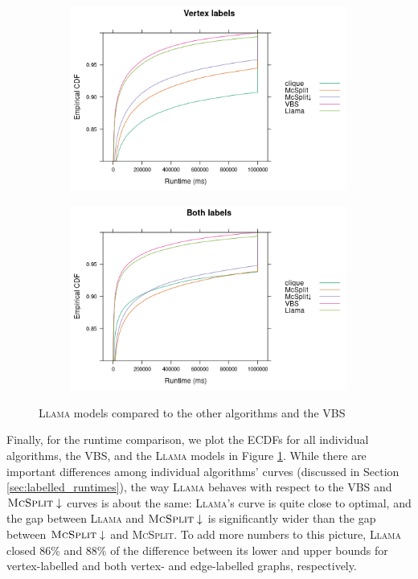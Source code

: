 \documentclass{l4proj}
\theoremstyle{definition}
\theoremstyle{remark}
\begin{document}
\begin{figure}
  \centering
  \begin{subfigure}[t]{0.49\textwidth}
    \centering
    \includegraphics[width=\textwidth]{images/ecdf_vertex_labels_llama.png}
  \end{subfigure}
  \begin{subfigure}[t]{0.49\textwidth}
    \centering
    \includegraphics[width=\textwidth]{images/ecdf_both_labels_llama.png}
  \end{subfigure}
  \caption{\textsc{Llama} models compared to the other algorithms and the VBS}
  \label{fig:ecdf_llama}
\end{figure}

Finally, for the runtime comparison, we plot the ECDFs for all individual
algorithms, the VBS, and the \textsc{Llama} models in Figure
\ref{fig:ecdf_llama}. While there are important differences among individual
algorithms' curves (discussed in Section \ref{sec:labelled_runtimes}), the way
\textsc{Llama} behaves with respect to the VBS and $\textsc{McSplit}\downarrow$
curves is about the same: \textsc{Llama}'s curve is quite close to optimal, and
the gap between \textsc{Llama} and $\textsc{McSplit}\downarrow$ is significantly
wider than the gap between $\textsc{McSplit}\downarrow$ and \textsc{McSplit}. To
add more numbers to this picture, \textsc{Llama} closed 86\% and 88\% of the
difference between its lower and upper bounds for vertex-labelled and both
vertex- and edge-labelled graphs, respectively.




\end{document}
